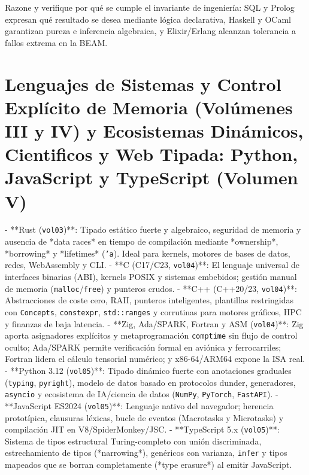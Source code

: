 \documentclass{book}
\begin{document}
\begin{tcolorbox}[title={Autoficha}, studiumcheck, breakable]

Razone y verifique por qué se cumple el invariante de ingeniería: SQL y Prolog expresan qué resultado se desea mediante lógica declarativa, Haskell y OCaml garantizan pureza e inferencia algebraica, y Elixir/Erlang alcanzan tolerancia a fallos extrema en la BEAM.
\end{tcolorbox}

\section{Lenguajes de Sistemas y Control Explícito de Memoria (Volúmenes III y IV) y Ecosistemas Dinámicos, Cientificos y Web Tipada: Python, JavaScript y TypeScript (Volumen V)}

- **Rust (\texttt{vol03})**: Tipado estático fuerte y algebraico, seguridad de memoria y ausencia de *data races* en tiempo de compilación mediante *ownership*, *borrowing* y *lifetimes* (\texttt{'a}). Ideal para kernels, motores de bases de datos, redes, WebAssembly y CLI.
- **C (C17/C23, \texttt{vol04})**: El lenguaje universal de interfaces binarias (ABI), kernels POSIX y sistemas embebidos; gestión manual de memoria (\texttt{malloc}/\texttt{free}) y punteros crudos.
- **C++ (C++20/23, \texttt{vol04})**: Abstracciones de coste cero, RAII, punteros inteligentes, plantillas restringidas con \texttt{Concepts}, \texttt{constexpr}, \texttt{std::ranges} y corrutinas para motores gráficos, HPC y finanzas de baja latencia.
- **Zig, Ada/SPARK, Fortran y ASM (\texttt{vol04})**: Zig aporta asignadores explícitos y metaprogramación \texttt{comptime} sin flujo de control oculto; Ada/SPARK permite verificación formal en aviónica y ferrocarriles; Fortran lidera el cálculo tensorial numérico; y x86-64/ARM64 expone la ISA real.
- **Python 3.12 (\texttt{vol05})**: Tipado dinámico fuerte con anotaciones graduales (\texttt{typing}, \texttt{pyright}), modelo de datos basado en protocolos dunder, generadores, \texttt{asyncio} y ecosistema de IA/ciencia de datos (\texttt{NumPy}, \texttt{PyTorch}, \texttt{FastAPI}).
- **JavaScript ES2024 (\texttt{vol05})**: Lenguaje nativo del navegador; herencia prototípica, clausuras léxicas, bucle de eventos (Macrotasks y Microtasks) y compilación JIT en V8/SpiderMonkey/JSC.
- **TypeScript 5.x (\texttt{vol05})**: Sistema de tipos estructural Turing-completo con unión discriminada, estrechamiento de tipos (*narrowing*), genéricos con varianza, \texttt{infer} y tipos mapeados que se borran completamente (*type erasure*) al emitir JavaScript.
\end{document}
